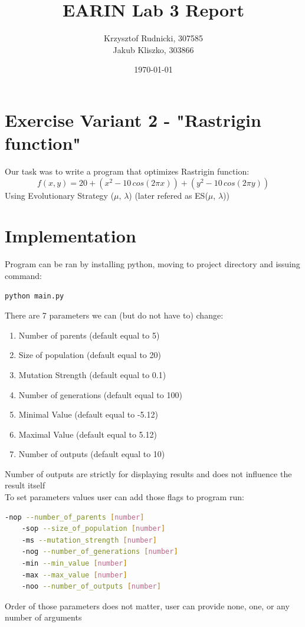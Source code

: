 \documentclass{article}[12pt]
\title{EARIN Lab 3 Report}
\author{Krzysztof Rudnicki, 307585 \\ Jakub Kliszko, 303866  }
\date{\today}
\begin{document}
\maketitle

\section{Exercise Variant 2 - "Rastrigin function"}
Our task was to write a program that optimizes Rastrigin function: \\
\[ f (x, y) =
20 + (x^2 - 10 \, cos(2πx)) + (y^2 - 10 \,  cos(2πy)) \]
Using Evolutionary Strategy ($\mu$, $\lambda$) (later refered as ES($\mu$, $\lambda$)) \\ 

\section{Implementation}
Program can be ran by installing python, moving to project directory and issuing command:
\begin{lstlisting}[language=bash]
python main.py
\end{lstlisting}
There are 7 parameters we can (but do not have to) change:
\begin{enumerate}
\item Number of parents (default equal to 5)
\item Size of population (default equal to 20)
\item Mutation Strength (default equal to 0.1)
\item Number of generations (default equal to 100)
\item Minimal Value (default equal to -5.12)
\item Maximal Value (default equal to 5.12)
\item Number of outputs (default equal to 10)
\end{enumerate}
Number of outputs are strictly for displaying results and does not influence the result itself \\ 
To set parameters values user can add those flags to program run:
\begin{lstlisting}[language=bash]
    -nop --number_of_parents [number]
    -sop --size_of_population [number]
    -ms --mutation_strength [number]
    -nog --number_of_generations [number]
    -min --min_value [number]
    -max --max_value [number]
    -noo --number_of_outputs [number]
\end{lstlisting}
Order of those parameters does not matter, user can provide none, one, or any number of arguments \\ 
\end{document}
